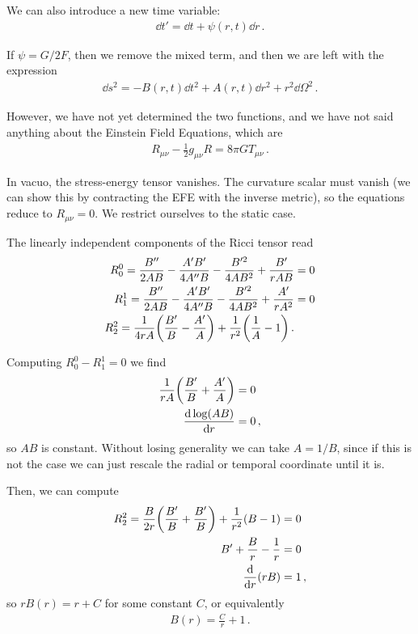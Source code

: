 \documentclass[main.tex]{subfiles}
\begin{document}
We can also introduce a new time variable: 
%
\begin{align}
\dd{t'} = \dd{t} + \psi (r, t) \dd{r} 
\,.
\end{align}

If \(\psi = G / 2F\), then we remove the mixed term, and then we are left with the expression 
%
\begin{align}
\dd{s^2} = -B (r, t) \dd{t^2} + A(r, t) \dd{r^2} + r^2 \dd{\Omega^2}
\,.
\end{align}

However, we have not yet determined the two functions, and we have not said anything about the Einstein Field Equations, which are 
%
\begin{align}
R_{\mu \nu } - \frac{1}{2} g_{\mu \nu } R = 8 \pi G T_{\mu \nu }
\,.
\end{align}

In vacuo, the stress-energy tensor vanishes. 
The curvature scalar must vanish (we can show this by contracting the EFE with the inverse metric), so the equations reduce to \(R_{\mu \nu } = 0\). 
We restrict ourselves to the static case. 

The linearly independent components of the Ricci tensor read 
%
\begin{align}
R_{0}^{0} = \frac{B''}{2AB} - \frac{A' B'}{4 A'' B}
- \frac{B^{\prime 2}}{4AB^2} + \frac{B'}{rAB} &= 0 \\
R_{1}^{1} = \frac{B''}{2AB} - \frac{A' B'}{4 A'' B}
- \frac{B^{\prime 2}}{4AB^2} + \frac{A'}{rA^2} &= 0 \\ 
R_{2}^{2} = \frac{1}{4rA} \qty(\frac{B'}{B} - \frac{A'}{A})
+ \frac{1}{r^2} \qty( \frac{1}{A} - 1)
\,.
\end{align}

Computing \(R^{0}_{0} - R^{1}_{1} = 0\) we find 
%
\begin{align}
\frac{1}{rA} \qty(\frac{B'}{B} + \frac{A'}{A} )&= 0  \\
\dv{\log (AB)}{r} &= 0
\,,
\end{align}
%
so \(AB\) is constant.
Without losing generality we can take \(A = 1/B\), since if this is not the case we can just rescale the radial or temporal coordinate until it is.

Then, we can compute 
%
\begin{align}
R^{2}_{2} = \frac{B}{2r} \qty(\frac{B'}{B} + \frac{B'}{B}) + \frac{1}{r^2} (B-1) &= 0  \\
B' + \frac{B}{r} - \frac{1}{r} &= 0  \\
\dv{}{r} \qty(rB) &= 1
\,,
\end{align}
%
so \(r B(r) = r + C\) for some constant \(C\), or equivalently 
%
\begin{align}
B (r) = \frac{C}{r} + 1
\,.
\end{align}
\end{document}
